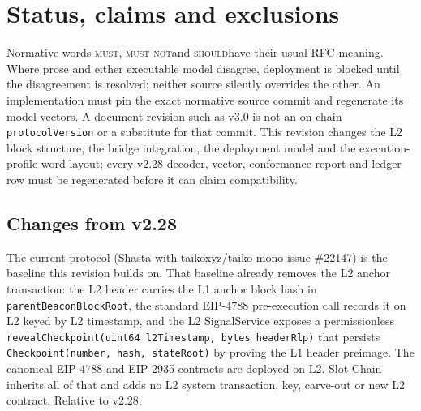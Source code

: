 \documentclass[a4paper,11pt]{article}
\newcommand{\code}[1]{\nolinkurl{#1}}
\newcommand{\must}{\textsc{must}}
\newcommand{\mustnot}{\textsc{must not}}
\newcommand{\should}{\textsc{should}}
\begin{document}
{\small\tableofcontents}
\clearpage
\section{Status, claims and exclusions}\label{sec:status}

Normative words \must, \mustnot and \should have their usual RFC meaning.
Where prose and either executable model disagree, deployment is blocked until
the disagreement is resolved; neither source silently overrides the other.
An implementation must pin the exact normative source commit and regenerate
its model vectors.  A document revision such as v3.0 is not an on-chain
\code{protocolVersion} or a substitute for that commit.  This revision changes
the L2 block structure, the bridge integration, the deployment model and the
execution-profile word layout; every v2.28 decoder, vector, conformance report
and ledger row must be regenerated before it can claim compatibility.

\subsection{Changes from v2.28}\label{sec:changes}

The current protocol (Shasta with taikoxyz/taiko-mono issue \#22147) is the
baseline this revision builds on.  That baseline already removes the L2 anchor
transaction: the L2 header carries the L1 anchor block hash in
\code{parentBeaconBlockRoot}, the standard EIP-4788 pre-execution call records
it on L2 keyed by L2 timestamp, and the L2 SignalService exposes a
permissionless \code{revealCheckpoint(uint64 l2Timestamp, bytes headerRlp)}
that persists \code{Checkpoint(number, hash, stateRoot)} by proving the L1
header preimage.  The canonical EIP-4788 and EIP-2935 contracts are deployed on
L2.  Slot-Chain inherits all of that and adds no L2 system transaction, key,
carve-out or new L2 contract.  Relative to v2.28:
\end{document}
